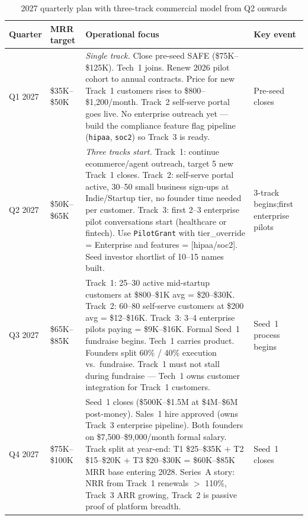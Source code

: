 \begin{table}[H]
\centering
\renewcommand{\arraystretch}{1.7}
\begin{tabularx}{\textwidth}{@{}llXl@{}}
\toprule
\textbf{Quarter} & \textbf{MRR target} &
\textbf{Operational focus} & \textbf{Key event} \\
\midrule
Q1 2027 & \$35K--\$50K &
  \textit{Single track.} Close pre-seed SAFE (\$75K--\$125K). Tech~1 joins.
  Renew 2026 pilot cohort to annual contracts. Price for new Track~1
  customers rises to \$800--\$1,200/month. Track~2 self-serve portal goes
  live. No enterprise outreach yet --- build the compliance feature flag
  pipeline (\texttt{hipaa}, \texttt{soc2}) so Track~3 is ready. &
  Pre-seed closes \\
\midrule
Q2 2027 & \$50K--\$65K &
  \textit{Three tracks start.}
  Track~1: continue ecommerce/agent outreach, target 5 new Track~1 closes.
  Track~2: self-serve portal active, 30--50 small business sign-ups at
  Indie/Startup tier, no founder time needed per customer.
  Track~3: first 2--3 enterprise pilot conversations start (healthcare or
  fintech). Use \texttt{PilotGrant} with tier\_override = Enterprise and
  features = [hipaa/soc2]. Seed investor shortlist of 10--15 names built. &
  3-track begins;\newline first enterprise pilots \\
\midrule
Q3 2027 & \$65K--\$85K &
  Track~1: 25--30 active mid-startup customers at \$800--\$1K avg = \$20--\$30K.
  Track~2: 60--80 self-serve customers at \$200 avg = \$12--\$16K.
  Track~3: 3--4 enterprise pilots paying = \$9K--\$16K.
  Formal Seed~1 fundraise begins. Tech~1 carries product. Founders
  split 60\% / 40\% execution vs.\ fundraise. Track~1 must not stall during
  fundraise --- Tech~1 owns customer integration for Track~1 customers. &
  Seed~1 process begins \\
\midrule
Q4 2027 & \$75K--\$100K &
  Seed~1 closes (\$500K--\$1.5M at \$4M--\$6M post-money).
  Sales~1 hire approved (owns Track~3 enterprise pipeline).
  Both founders on \$7,500--\$9,000/month formal salary.
  Track split at year-end: T1 \$25--\$35K $+$ T2 \$15--\$20K $+$
  T3 \$20--\$30K = \$60K--\$85K MRR base entering 2028.
  Series~A story: NRR from Track~1 renewals $>$ 110\%,
  Track~3 ARR growing, Track~2 is passive proof of platform breadth. &
  Seed~1 closes \\
\bottomrule
\end{tabularx}
\caption{2027 quarterly plan with three-track commercial model from Q2 onwards}
\end{table}


